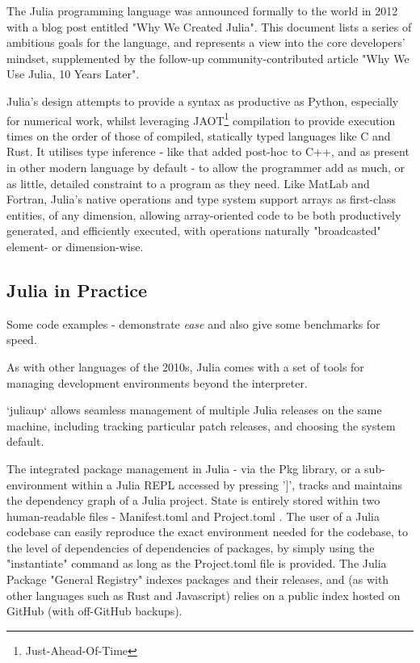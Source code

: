 \documentclass{webofc}
\begin{document}
The Julia programming language was announced formally to the world in 2012 with a blog post entitled "Why We Created Julia"\cite{bib:why-create-julia}.
This document lists a series of ambitious goals for the language, and represents a view into the core developers' mindset, supplemented by the follow-up 
community-contributed article "Why We Use Julia, 10 Years Later"\cite{why-julia-10}. 

Julia's design attempts to provide a syntax as productive as Python, especially for numerical work, whilst leveraging JAOT\footnote{Just-Ahead-Of-Time} compilation to provide execution times
on the order of those of compiled, statically typed languages like C and Rust. It utilises type inference - like that added post-hoc to C++, and as present in other 
modern language by default - to allow the programmer add as much, or as little, detailed constraint to a program as they need. Like MatLab and Fortran,
Julia's native operations and type system support arrays as first-class entities, of any dimension, allowing array-oriented code to be both
productively generated, and efficiently executed, with operations naturally "broadcasted" element- or dimension-wise. 



\subsection{Julia in Practice}

Some code examples - demonstrate \emph{ease} and also give some benchmarks for
speed.



As with other languages of the 2010s, Julia comes with a set of tools for managing development environments beyond the interpreter.

`juliaup` allows seamless management of multiple Julia releases on the same machine, including tracking particular patch releases, and 
choosing the system default.

The integrated package management in Julia - via the Pkg library, or a sub-environment within a Julia REPL accessed by pressing '$]$', 
tracks and maintains the dependency graph of a Julia project. State is entirely stored within two human-readable files - Manifest.toml and Project.toml
. The user of a Julia codebase can easily reproduce the exact environment needed for the codebase, to the level of dependencies of 
dependencies of packages, by simply using the "instantiate" command as long as the Project.toml file is provided.
The Julia Package "General Registry" indexes packages and their releases, and (as with other languages such as Rust and Javascript) relies on a public
index hosted on GitHub (with off-GitHub backups).
\end{document}
